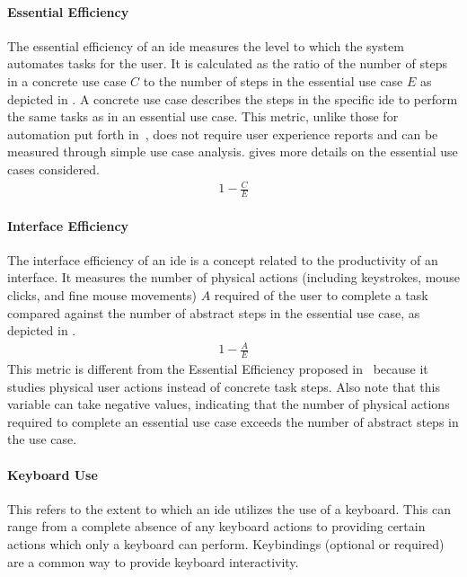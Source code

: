 \paragraph{Essential Efficiency}
The essential efficiency of an \ac{ide} measures the level to which the
system automates tasks for the user. It is calculated as the ratio of the
number of steps in a concrete use case $C$ to the number of steps in the
essential use case $E$ as depicted in . A concrete use
case describes the steps in the specific \ac{ide} to perform the same tasks
as in an essential use case. This metric, unlike those for automation put
forth in~\cite{wei1998}, does not require user experience reports and can
be measured through simple use case analysis. 
gives more details on the essential use cases considered.
%
\begin{align}\label{eq:eefficiency}
  1 - \frac{C}{E}
\end{align}


\paragraph{Interface Efficiency}
The interface efficiency of an \ac{ide} is a concept related to the
productivity of an interface. It measures the number of physical actions
(including keystrokes, mouse clicks, and fine mouse movements) $A$ required
of the user to complete a task compared against the number of abstract
steps in the essential use case, as depicted in .
%
\begin{align}\label{eq:iefficiency}
  1 - \frac{A}{E}
\end{align}
%
This metric is different from the Essential Efficiency proposed
in~\cite{constantine1996} because it studies physical user actions instead
of concrete task steps. Also note that this variable can take negative
values, indicating that the number of physical actions required to complete
an essential use case exceeds the number of abstract steps in the use case.


\paragraph{Keyboard Use}
This refers to the extent to which an \ac{ide} utilizes the use of a
keyboard. This can range from a complete absence of any keyboard actions
to providing certain actions which only a keyboard can perform. Keybindings
(optional or required) are a common way to provide keyboard interactivity.

